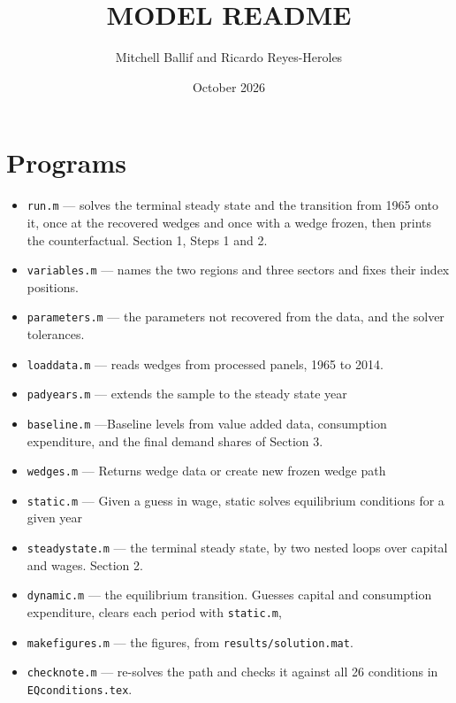\documentclass[11pt]{article}
\title{\textbf{MODEL README}}
\author{Mitchell Ballif and Ricardo Reyes-Heroles}
\date{October 2026}
\begin{document}
\maketitle



\section*{Programs}

\begin{itemize}

\item \texttt{run.m} --- solves the terminal steady state and the
transition from 1965 onto it, once at the recovered wedges and once with a
wedge frozen, then prints the counterfactual. Section 1, Steps 1 and 2.

\item \texttt{variables.m} --- names the two regions and three sectors and
fixes their index positions.

\item \texttt{parameters.m} --- the parameters not recovered from the data,
and the solver tolerances.

\item \texttt{loaddata.m} --- reads wedges from  processed panels, 1965 to 2014. 

\item \texttt{padyears.m} --- extends the sample to the steady state year

\item \texttt{baseline.m} ---Baseline levels from value added data,
consumption expenditure, and the final demand shares of Section 3.

\item \texttt{wedges.m} --- Returns wedge data or create new frozen wedge path

\item \texttt{static.m} --- Given a guess in wage,  static solves equilibrium conditions for a given year
\item \texttt{steadystate.m} --- the terminal steady state, by two nested
loops over capital and wages. Section 2.

\item \texttt{dynamic.m} --- the equilibrium transition. Guesses capital and
consumption expenditure, clears each period with \texttt{static.m}, 

\item \texttt{makefigures.m} --- the figures, from
\texttt{results/solution.mat}.

\item \texttt{checknote.m} --- re-solves the path and checks it against all 26
conditions in \texttt{EQconditions.tex}.

\end{itemize}
\end{document}

